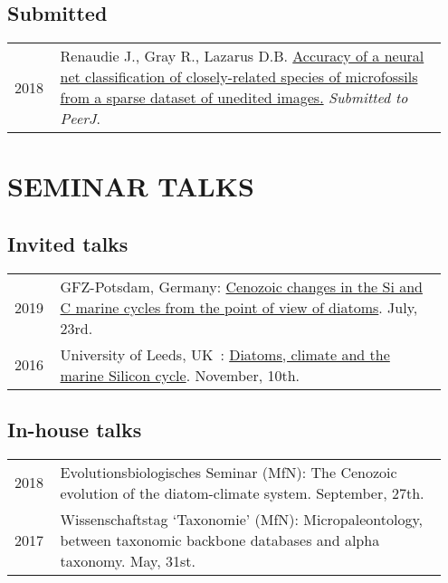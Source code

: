\documentclass[11pt, a4paper]{article}
\begin{document}
\subsection{Submitted}
\begin{longtable}{p{0.1\linewidth} P{0.85\linewidth}}
2018 & Renaudie J., Gray R., Lazarus D.B. \href{https://peerj.com/preprints/27328/}{Accuracy of a neural net classification of closely-related species of microfossils from a sparse dataset of unedited images.} \textit{Submitted to PeerJ}.\\
\end{longtable}

\section{SEMINAR TALKS}
\subsection{Invited talks}
\begin{longtable}{p{0.1\linewidth} P{0.85\linewidth}}
2019 %
 & GFZ-Potsdam, Germany: \href{http://plannapus.github.io/data/20190723Potsdam.pdf}{Cenozoic changes in the Si and C marine cycles from the point of view of diatoms}. July, 23rd.\\
2016 & University of Leeds, UK : \href{http://www.see.leeds.ac.uk/research/iag/geoscience-seminars/event/?SemID=534}{Diatoms, climate and the marine Silicon cycle}. November, 10th.\\
\end{longtable}
\subsection{In-house talks}
\begin{longtable}{p{0.1\linewidth} P{0.85\linewidth}}
2018 & Evolutionsbiologisches Seminar (MfN): The Cenozoic evolution of the diatom-climate system. September, 27th.\\
2017 & Wissenschaftstag `Taxonomie' (MfN): Micropaleontology, between taxonomic backbone databases and alpha taxonomy. May, 31st.\\
\end{longtable}
\end{document}
